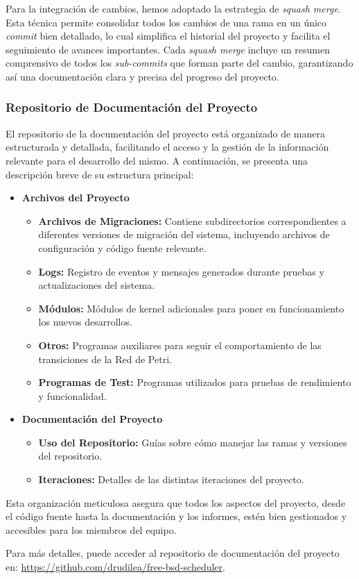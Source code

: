 Para la integración de cambios, hemos adoptado la estrategia de \textit{squash merge}. Esta técnica permite consolidar todos los cambios de una rama en un único \textit{commit} bien detallado, lo cual simplifica el historial del proyecto y facilita el seguimiento de avances importantes. Cada \textit{squash merge} incluye un resumen comprensivo de todos los \textit{sub-commits} que forman parte del cambio, garantizando así una documentación clara y precisa del progreso del proyecto.

\subsubsection{Repositorio de Documentación del Proyecto}

El repositorio de la documentación del proyecto está organizado de manera estructurada y detallada, facilitando el acceso y la gestión de la información relevante para el desarrollo del mismo. A continuación, se presenta una descripción breve de su estructura principal:

\begin{itemize}
    \item \textbf{Archivos del Proyecto}
    \begin{itemize}
        \item \textbf{Archivos de Migraciones:} Contiene subdirectorios correspondientes a diferentes versiones de migración del sistema, incluyendo archivos de configuración y código fuente relevante.
        \item \textbf{Logs:} Registro de eventos y mensajes generados durante pruebas y actualizaciones del sistema.
        \item \textbf{Módulos:} Módulos de kernel adicionales para poner en funcionamiento los nuevos desarrollos.
        \item \textbf{Otros:} Programas auxiliares para seguir el comportamiento de las transiciones de la Red de Petri.
        \item \textbf{Programas de Test:} Programas utilizados para pruebas de rendimiento y funcionalidad.
    \end{itemize}
    \item \textbf{Documentación del Proyecto}
    \begin{itemize}
        \item \textbf{Uso del Repositorio:} Guías sobre cómo manejar las ramas y versiones del repositorio.
        \item \textbf{Iteraciones:} Detalles de las distintas iteraciones del proyecto.
    \end{itemize}
\end{itemize}

Esta organización meticulosa asegura que todos los aspectos del proyecto, desde el código fuente hasta la documentación y los informes, estén bien gestionados y accesibles para los miembros del equipo.

Para más detalles, puede acceder al repositorio de documentación del proyecto en: \url{https://github.com/drudilea/free-bsd-scheduler}.
